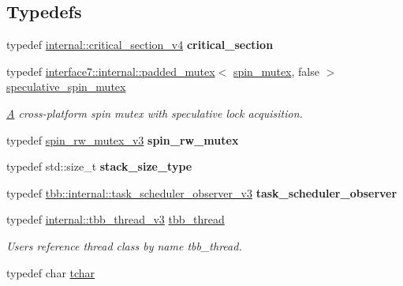 \subsection*{Typedefs}
\begin{DoxyCompactItemize}
\item 
\hypertarget{namespacetbb_a889d8f126388fdc24c597d195a4d7028}{}typedef \hyperlink{classtbb_1_1internal_1_1critical__section__v4}{internal\+::critical\+\_\+section\+\_\+v4} {\bfseries critical\+\_\+section}\label{namespacetbb_a889d8f126388fdc24c597d195a4d7028}

\item 
typedef \hyperlink{classtbb_1_1interface7_1_1internal_1_1padded__mutex}{interface7\+::internal\+::padded\+\_\+mutex}$<$ \hyperlink{classtbb_1_1spin__mutex}{spin\+\_\+mutex}, false $>$ \hyperlink{group__synchronization_gaaa37cbd66059817a12393e6ff53ae3be}{speculative\+\_\+spin\+\_\+mutex}
\begin{DoxyCompactList}\small\item\em \hyperlink{structA}{A} cross-\/platform spin mutex with speculative lock acquisition. \end{DoxyCompactList}\item 
\hypertarget{namespacetbb_a6cc3d02744cab8ac389919806d47e417}{}typedef \hyperlink{classtbb_1_1spin__rw__mutex__v3}{spin\+\_\+rw\+\_\+mutex\+\_\+v3} {\bfseries spin\+\_\+rw\+\_\+mutex}\label{namespacetbb_a6cc3d02744cab8ac389919806d47e417}

\item 
\hypertarget{namespacetbb_a1a268320974a3357e9609a2f98be5090}{}typedef std\+::size\+\_\+t {\bfseries stack\+\_\+size\+\_\+type}\label{namespacetbb_a1a268320974a3357e9609a2f98be5090}

\item 
\hypertarget{namespacetbb_af58de4ab3200dd2bd621f052c6f677e4}{}typedef \hyperlink{classtbb_1_1internal_1_1task__scheduler__observer__v3}{tbb\+::internal\+::task\+\_\+scheduler\+\_\+observer\+\_\+v3} {\bfseries task\+\_\+scheduler\+\_\+observer}\label{namespacetbb_af58de4ab3200dd2bd621f052c6f677e4}

\item 
\hypertarget{namespacetbb_a7805ca254302ff88b566f7dcde7e56b0}{}typedef \hyperlink{classtbb_1_1internal_1_1tbb__thread__v3}{internal\+::tbb\+\_\+thread\+\_\+v3} \hyperlink{namespacetbb_a7805ca254302ff88b566f7dcde7e56b0}{tbb\+\_\+thread}\label{namespacetbb_a7805ca254302ff88b566f7dcde7e56b0}

\begin{DoxyCompactList}\small\item\em Users reference thread class by name tbb\+\_\+thread. \end{DoxyCompactList}\item 
\hypertarget{namespacetbb_abb0195ccca203ba1b9f262ac1ee8d813}{}typedef char \hyperlink{namespacetbb_abb0195ccca203ba1b9f262ac1ee8d813}{tchar}\label{namespacetbb_abb0195ccca203ba1b9f262ac1ee8d813}


\end{DoxyCompactItemize}
